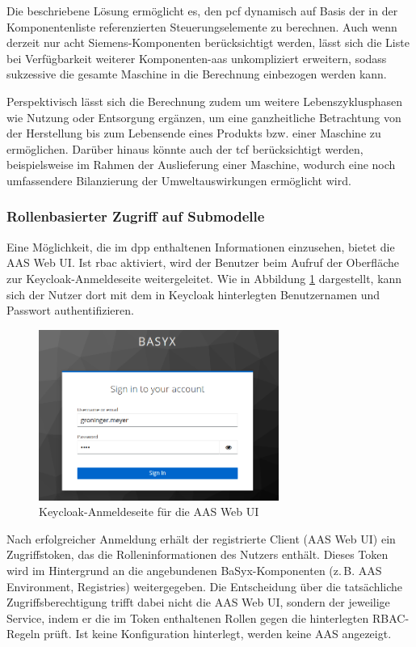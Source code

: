 Die beschriebene Lösung ermöglicht es, den \acs{pcf} dynamisch auf Basis der in der Komponentenliste referenzierten Steuerungselemente zu berechnen. 
Auch wenn derzeit nur acht Siemens-Komponenten berücksichtigt werden, lässt sich die Liste bei Verfügbarkeit weiterer Komponenten-\acs{aas} unkompliziert erweitern, sodass sukzessive die gesamte Maschine in die Berechnung einbezogen werden kann.

Perspektivisch lässt sich die Berechnung zudem um weitere Lebenszyklusphasen wie Nutzung oder Entsorgung ergänzen, um eine ganzheitliche Betrachtung von der Herstellung bis zum Lebensende eines Produkts bzw. einer Maschine zu ermöglichen.
Darüber hinaus könnte auch der \acs{tcf} berücksichtigt werden, beispielsweise im Rahmen der Auslieferung einer Maschine, wodurch eine noch umfassendere Bilanzierung der Umweltauswirkungen ermöglicht wird.

\subsubsection{Rollenbasierter Zugriff auf Submodelle}
Eine Möglichkeit, die im \acs{dpp} enthaltenen Informationen einzusehen, bietet die AAS Web UI. 
Ist \acs{rbac} aktiviert, wird der Benutzer beim Aufruf der Oberfläche zur Keycloak-Anmeldeseite weitergeleitet. 
Wie in Abbildung \ref{fig:KeycloakAnmeldeSeite} dargestellt, kann sich der Nutzer dort mit dem in Keycloak hinterlegten Benutzernamen und Passwort authentifizieren.

\begin{figure}[htbp]
    \centering
        \includegraphics[width=0.7\textwidth]{Bilder/Ergebnisse/DPP/KeycloakAnmeldeSeite.png}
    \caption{Keycloak-Anmeldeseite für die AAS Web UI}
    \label{fig:KeycloakAnmeldeSeite}
\end{figure}

Nach erfolgreicher Anmeldung erhält der registrierte Client (AAS Web UI) ein Zugriffstoken, das die Rolleninformationen des Nutzers enthält.  
Dieses Token wird im Hintergrund an die angebundenen BaSyx-Komponenten (z.\,B. AAS Environment, Registries) weitergegeben.  
Die Entscheidung über die tatsächliche Zugriffsberechtigung trifft dabei nicht die AAS Web UI, sondern der jeweilige Service, indem er die im Token enthaltenen Rollen gegen die hinterlegten RBAC-Regeln prüft.
Ist keine Konfiguration hinterlegt, werden keine AAS angezeigt.

